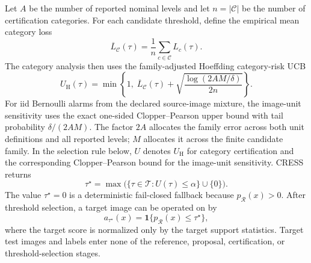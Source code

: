 Let $A$ be the number of reported nominal levels and let $n=|\mathcal{C}|$ be the number of certification categories. For each candidate threshold, define the empirical mean category loss
\begin{equation}\label{eq:cress-mean-category-loss}
    \overline{L}_{\mathcal C}(\tau)=\frac{1}{n}\sum_{c\in\mathcal{C}}L_c(\tau).
\end{equation}
The category analysis then uses the family-adjusted Hoeffding category-risk UCB
\begin{equation}\label{eq:sc3r-ucb}
    U_{\mathrm{H}}(\tau)=\min\!\left\{1,\;
    \overline{L}_{\mathcal C}(\tau)+
    \sqrt{\frac{\log(2AM/\delta)}{2n}}\right\}.
\end{equation}
For iid Bernoulli alarms from the declared source-image mixture, the image-unit sensitivity uses the exact one-sided Clopper--Pearson upper bound with tail probability $\delta/(2AM)$. The factor $2A$ allocates the family error across both unit definitions and all reported levels; $M$ allocates it across the finite candidate family. In the selection rule below, $U$ denotes $U_{\mathrm H}$ for category certification and the corresponding Clopper--Pearson bound for the image-unit sensitivity. CRESS returns
\begin{equation}\label{eq:cress-selected-threshold}
    \tau^\star=
    \max\bigl(\{\tau\in\mathcal{T}:U(\tau)\leq\alpha\}\cup\{0\}\bigr).
\end{equation}
The value $\tau^\star=0$ is a deterministic fail-closed fallback because $p_{\mathcal{R}}(x)>0$. After threshold selection, a target image can be operated on by
\begin{equation}\label{eq:cress-target-decision}
    a_{\tau^\star}(x)
    =\mathbf{1}\{p_{\mathcal{R}}(x)\leq\tau^\star\},
\end{equation}
where the target score is normalized only by the target support statistics. Target test images and labels enter none of the reference, proposal, certification, or threshold-selection stages.

